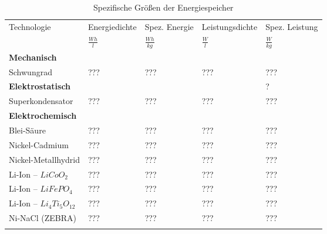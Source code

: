 \begin{table}\centering
	\begin{tabularx}{\linewidth}{lllll}
		\toprule
		\multirow{2}{*}{Technologie} & Energiedichte  & Spez. Energie   & Leistungsdichte & Spez. Leistung \\
		                             & $\frac{Wh}{l}$ & $\frac{Wh}{kg}$ & $\frac{W}{l}$   & $\frac{W}{kg}$ \\ \midrule
		\textbf{Mechanisch}          &                &                 &                 &  \\
		Schwungrad                   & ???            & ???             & ???             & ???            \\
		\textbf{Elektrostatisch}     &                &                 &                 & ?              \\
		Superkondensator             & ???            & ???             & ???             & ???            \\
		\textbf{Elektrochemisch}     &                &                 &                 &  \\
		Blei-Säure                   & ???            & ???             & ???             & ???            \\
		Nickel-Cadmium               & ???            & ???             & ???             & ???            \\
		Nickel-Metallhydrid          & ???            & ???             & ???             & ???            \\
		Li-Ion -- $LiCoO_2$          & ???            & ???             & ???             & ???            \\
		Li-Ion -- $LiFePO_4$         & ???            & ???             & ???             & ???            \\
		Li-Ion -- $Li_4Ti_5O_{12}$   & ???            & ???             & ???             & ???            \\
		Ni-NaCl (ZEBRA)              & ???            & ???             & ???             & ???            \\ \bottomrule
		                             &
	\end{tabularx}
	\caption{Spezifische Größen der Energiespeicher}
	\label{hierdoof}
\end{table}

